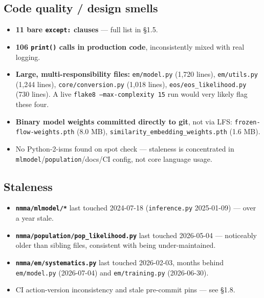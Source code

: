 \documentclass[10pt]{article}
\newcommand{\code}[1]{\texttt{#1}}
\begin{document}
\subsection{Code quality / design smells}
\begin{itemize}
\item \textbf{11 bare \code{except:} clauses} --- full list in \S1.5.
\item \textbf{106 \code{print()} calls in production code}, inconsistently mixed
  with real logging.
\item \textbf{Large, multi-responsibility files:} \code{em/model.py} (1{,}720
  lines), \code{em/utils.py} (1{,}244 lines), \code{core/conversion.py} (1{,}018
  lines), \code{eos/eos\_likelihood.py} (730 lines). A live \code{flake8
  --max-complexity 15} run would very likely flag these four.
\item \textbf{Binary model weights committed directly to git}, not via LFS:
  \code{frozen-flow-weights.pth} (8.0 MB), \code{similarity\_embedding\_weights.pth}
  (1.6 MB).
\item No Python-2-isms found on spot check --- staleness is concentrated in
  \code{mlmodel}/\code{population}/docs/CI config, not core language usage.
\end{itemize}

\subsection{Staleness}
\begin{itemize}
\item \textbf{\code{nmma/mlmodel/*}} last touched 2024-07-18
  (\code{inference.py} 2025-01-09) --- over a year stale.
\item \textbf{\code{nmma/population/pop\_likelihood.py}} last touched 2026-05-04 ---
  noticeably older than sibling files, consistent with being under-maintained.
\item \textbf{\code{nmma/em/systematics.py}} last touched 2026-02-03, months behind
  \code{em/model.py} (2026-07-04) and \code{em/training.py} (2026-06-30).
\item CI action-version inconsistency and stale pre-commit pins --- see \S1.8.
\end{itemize}
\end{document}
